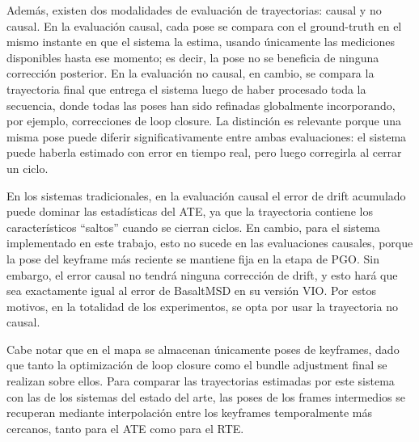 Además, existen dos modalidades de evaluación de trayectorias: causal y no causal. En la evaluación causal, cada pose se compara con el ground-truth en el mismo instante en que el sistema la estima, usando únicamente las mediciones disponibles hasta ese momento; es decir, la pose no se beneficia de ninguna corrección posterior. En la evaluación no causal, en cambio, se compara la trayectoria final que entrega el sistema luego de haber procesado toda la secuencia, donde todas las poses han sido refinadas globalmente incorporando, por ejemplo, correcciones de loop closure. La distinción es relevante porque una misma pose puede diferir significativamente entre ambas evaluaciones: el sistema puede haberla estimado con error en tiempo real, pero luego corregirla al cerrar un ciclo.

En los sistemas tradicionales, en la evaluación causal el error de drift acumulado puede dominar las estadísticas del ATE, ya que la trayectoria contiene los característicos ``saltos'' cuando se cierran ciclos. En cambio, para el sistema implementado en este trabajo, esto no sucede en las evaluaciones causales, porque la pose del keyframe más reciente se mantiene fija en la etapa de PGO. Sin embargo, el error causal no tendrá ninguna corrección de drift, y esto hará que sea exactamente igual al error de BasaltMSD en su versión VIO. Por estos motivos, en la totalidad de los experimentos, se opta por usar la trayectoria no causal.

Cabe notar que en el mapa se almacenan únicamente poses de keyframes, dado que tanto la optimización de loop closure como el bundle adjustment final se realizan sobre ellos. Para comparar las trayectorias estimadas por este sistema con las de los sistemas del estado del arte, las poses de los frames intermedios se recuperan mediante interpolación entre los keyframes temporalmente más cercanos, tanto para el ATE como para el RTE.

